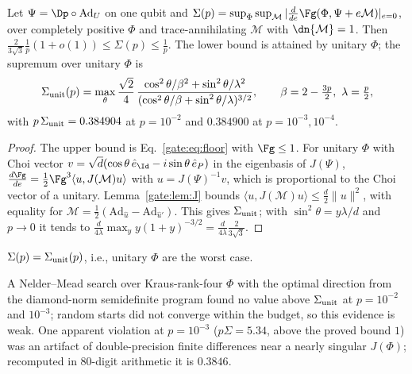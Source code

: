 \begin{proposition}\label{gate:prop:L2}
Let $\Psi=\Dp\circ\mathrm{Ad}_U$ on one qubit and $\Sigma(p)=\sup_\Phi\sup_{\mathcal M}|\frac{d}{de}\Fg(\Phi,\Psi+e\mathcal M)|_{e=0}$, over completely positive $\Phi$ and trace-annihilating $\mathcal M$ with $\dn{\mathcal M}=1$. Then $\frac{2}{3\sqrt3}\frac1p(1+o(1))\le\Sigma(p)\le\frac1p$. The lower bound is attained by unitary $\Phi$; the supremum over unitary $\Phi$ is
\begin{equation}
\Sigma_{\rm unit}(p)=\max_\theta\frac{\sqrt2}{4}\,\frac{\cos^2\theta/\beta^2+\sin^2\theta/\lambda^2}{(\cos^2\theta/\beta+\sin^2\theta/\lambda)^{3/2}},\qquad\beta=2-\tfrac{3p}{2},\ \lambda=\tfrac p2,
\end{equation}
with $p\,\Sigma_{\rm unit}=0.384904$ at $p=10^{-2}$ and $0.384900$ at $p=10^{-3},10^{-4}$.
\end{proposition}

\begin{proof}
The upper bound is Eq.~\eqref{gate:eq:floor} with $\Fg\le1$. For unitary $\Phi$ with Choi vector $v=\sqrt d(\cos\theta\,\hat e_{\Id}-i\sin\theta\,\hat e_P)$ in the eigenbasis of $J(\Psi)$, $\frac{d\Fg}{de}=\frac12\Fg^3\langle u,J(\mathcal M)u\rangle$ with $u=J(\Psi)^{-1}v$, which is proportional to the Choi vector of a unitary. Lemma~\ref{gate:lem:J} bounds $\langle u,J(\mathcal M)u\rangle\le\frac d2\|u\|^2$, with equality for $\mathcal M=\frac12(\mathrm{Ad}_{\hat u}-\mathrm{Ad}_{\hat u'})$. This gives $\Sigma_{\rm unit}$; with $\sin^2\theta=y\lambda/d$ and $p\to0$ it tends to $\frac{d}{4\lambda}\max_y y(1+y)^{-3/2}=\frac{d}{4\lambda}\frac{2}{3\sqrt3}$.
\end{proof}

\begin{conjecture}\label{gate:conj:L2}
$\Sigma(p)=\Sigma_{\rm unit}(p)$, i.e., unitary $\Phi$ are the worst case.
\end{conjecture}
A Nelder--Mead search over Kraus-rank-four $\Phi$ with the optimal direction from the diamond-norm semidefinite program found no value above $\Sigma_{\rm unit}$ at $p=10^{-2}$ and $10^{-3}$; random starts did not converge within the budget, so this evidence is weak. One apparent violation at $p=10^{-3}$ ($p\Sigma=5.34$, above the proved bound $1$) was an artifact of double-precision finite differences near a nearly singular $J(\Phi)$; recomputed in 80-digit arithmetic it is $0.3846$.

